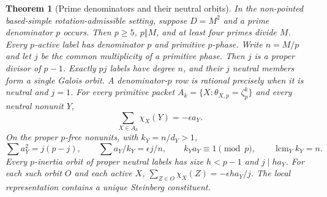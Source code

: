 \documentclass[11pt]{amsart}
\numberwithin{equation}{section}
\newtheorem{theorem}{Theorem}[section]
\theoremstyle{definition}
\theoremstyle{plain}
\DeclareMathOperator{\lcm}{lcm}
\begin{document}
\begin{theorem}[Prime denominators and their neutral orbits]
\label{new:one-packet}\label{new:phase-trace}\label{new:prime-den}\label{new:rational-prime-square}
In the non-pointed based-simple rotation-admissible setting, suppose
$D=M^2$ and a prime denominator $p$ occurs. Then $p\ge5$, $p\Vert M$,
and at least four primes divide $M$. Every $p$-active label has
denominator $p$ and primitive $p$-phase. Write $n=M/p$ and let $j$
be the common multiplicity of a primitive phase. Then $j$ is a proper
divisor of $p-1$. Exactly $pj$ labels have degree $n$, and their $j$
neutral members form a single Galois orbit. A denominator-$p$ row
is rational precisely when it is neutral and $j=1$.
For every primitive packet $A_k=\{X:\theta_{X,p}=\zeta_p^k\}$
and every neutral nonunit $Y$,
\begin{equation}\label{eq:packet-trace}
                \sum_{X\in A_k}\chi_X(Y)=-\epsilon a_Y .
\end{equation}
On the proper $p$-free nonunits, with $k_Y=n/d_Y>1$,
\[
 \sum a_Y^2=j(p-j),\qquad \sum a_Y/k_Y=\epsilon j/n,
 \qquad k_Y a_Y\equiv1\pmod p,\qquad\lcm_Y k_Y=n .
\]
Every $p$-inertia orbit of proper neutral labels has size $h<p-1$
and $j\mid h a_Y$. For each such orbit $O$ and each active $X$, $\sum_{Z\in O}\chi_X(Z)=-\epsilon h a_Y/j$. The local representation contains a unique Steinberg constituent.
\end{theorem}
\end{document}
